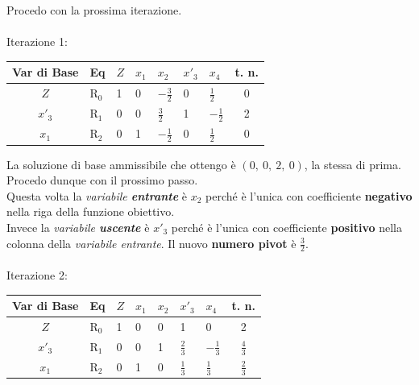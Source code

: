\documentclass[12pt, a4paper, openany]{book}
\begin{document}
\noindent Procedo con la prossima iterazione.\\
\\
\noindent Iterazione 1:
\begin{center}
    \begin{tabularx}{0.75\textwidth}{ |c|X|X|X|X|X|X|c| } 
        \hline
        Var di Base & Eq & $Z$ & $x_1$ & $x_2$ & $x'_3$ & $x_4$ & t. n.\\
        \hline
        \hline
        $Z$ & R$_0$ & 1 & 0 & $-\frac{3}{2}$ & 0 & $\frac{1}{2}$ & 0\\
        \hline 
        $x'_3$ & R$_1$ & 0 & 0 & $\frac{3}{2}$ & 1 & $-\frac{1}{2}$ & 2\\
        \hline 
        $x_1$ & R$_2$ & 0 & 1 & $-\frac{1}{2}$ & 0 & $\frac{1}{2}$ & 0\\
        \hline
    \end{tabularx}
\end{center}
\noindent La soluzione di base ammissibile che ottengo è $(0,\ 0,\ 2,\ 0)$, la stessa di prima. Procedo dunque con il prossimo passo.\\
\noindent Questa volta la \textit{variabile \textbf{entrante}} è $x_2$ perché è l'unica con coefficiente \textbf{negativo} nella riga della funzione obiettivo.\\
\noindent Invece la \textit{variabile \textbf{uscente}} è $x'_3$ perché è l'unica con coefficiente \textbf{positivo} nella colonna della \textit{variabile entrante}. Il nuovo \textbf{numero pivot} è $\frac{3}{2}$.\\
\\
\noindent Iterazione 2:
\begin{center}
    \begin{tabularx}{0.75\textwidth}{ |c|X|X|X|X|X|X|c| } 
        \hline
        Var di Base & Eq & $Z$ & $x_1$ & $x_2$ & $x'_3$ & $x_4$ & t. n.\\
        \hline
        \hline
        $Z$ & R$_0$ & 1 & 0 & 0 & 1 & 0 & 2\\
        \hline 
        $x'_3$ & R$_1$ & 0 & 0 & 1 & $\frac{2}{3}$ & $-\frac{1}{3}$ & $\frac{4}{3}$\\
        \hline 
        $x_1$ & R$_2$ & 0 & 1 & 0 & $\frac{1}{3}$ & $\frac{1}{3}$ & $\frac{2}{3}$\\
        \hline
    \end{tabularx}
\end{center}
\end{document}
